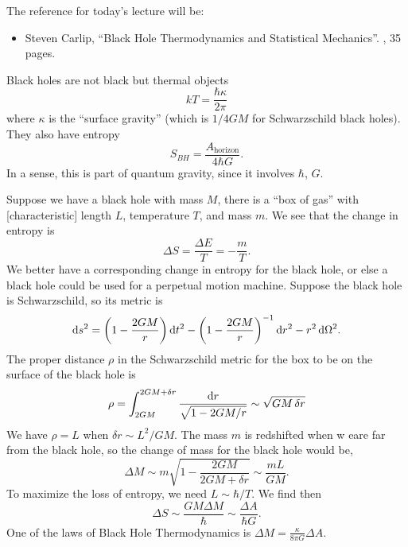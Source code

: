 
The reference for today's lecture will be:
\begin{itemize}
\item Steven Carlip,
  ``Black Hole Thermodynamics and Statistical Mechanics''.
  , 35 pages.
\end{itemize}
Black holes are not black but thermal objects
\begin{equation}
kT=\frac{\hbar \kappa}{2\pi}
\end{equation}
where $\kappa$ is the ``surface gravity'' (which is $1/4 GM$ for
Schwarzschild black holes). They also have entropy
\begin{equation}
S_{BH} = \frac{A_{\text{horizon}}}{4\hbar G}.
\end{equation}
In a sense, this is part of quantum gravity, since it involves $\hbar$,
$G$.

Suppose we have a black hole with mass $M$, there is a ``box of gas''
with [characteristic] length $L$, temperature $T$, and mass $m$. We see
that the change in entropy is
\begin{equation}
\Delta S = \frac{\Delta E}{T} = -\frac{m}{T}.
\end{equation}
We better have a corresponding change in entropy for the black hole, or
else a black hole could be used for a perpetual motion machine. Suppose
the black hole is Schwarzschild, so its metric is
\begin{equation}
\mathrm{d} s^{2} = \left(1 - \frac{2GM}{r}\right)\mathrm{d} t^{2} - \left(1 -
\frac{2GM}{r}\right)^{-1}\mathrm{d} r^{2} - r^{2}\,\mathrm{d}\Omega^{2}.
\end{equation}
The proper distance $\rho$ in the Schwarzschild metric for the box to be
on the surface of the black hole is
\begin{equation}
\rho =\int^{2GM+\delta r}_{2GM}\frac{\mathrm{d} r}{\sqrt{1 - 2GM/r}}
\sim\sqrt{GM\,\delta r}
\end{equation}
We have $\rho=L$ when $\delta r\sim L^{2}/GM$. The mass $m$ is
redshifted when w eare far from the black hole, so the change of mass
for the black hole would be,
\begin{equation}
\Delta M\sim m\sqrt{1 - \frac{2GM}{2GM+\delta r}}\sim\frac{m L}{GM}.
\end{equation}
To maximize the loss of entropy, we need $L\sim\hbar/T$. We find then
\begin{equation}
\Delta S\sim\frac{GM\Delta M}{\hbar}\sim\frac{\Delta A}{\hbar G}.
\end{equation}
One of the laws of Black Hole Thermodynamics is $\Delta M=\frac{\kappa}{8\pi G}\Delta A$.

